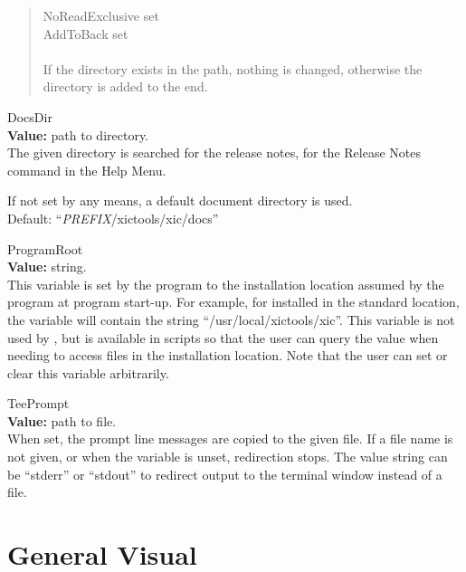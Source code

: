 \begin{quote}
{\et NoReadExclusive} set\\
{\et AddToBack} set\\
\\
If the directory exists in the path, nothing is changed, otherwise the
directory is added to the end.
\end{quote}

\begin{description}
\item{\et DocsDir}\\
{\bf Value:} path to directory.\\
The given directory is searched for the release notes, for the {\cb
Release Notes} command in the {\cb Help Menu}.

If not set by any means, a default document directory is used.\\
Default:  ``{\it PREFIX\/}{\vt /xictools/xic/docs}''

\item{\et ProgramRoot}\\
{\bf Value:} string.\\
This variable is set by the program to the installation location
assumed by the program at program start-up.  For example, for {\Xic}
installed in the standard location, the variable will contain the
string ``{\vt /usr/local/xictools/xic}''.  This variable is not used
by {\Xic}, but is available in scripts so that the user can query the
value when needing to access files in the installation location.  Note
that the user can set or clear this variable arbitrarily.

\item{\et TeePrompt}\\
{\bf Value:} path to file.\\
When set, the prompt line messages are copied to the given file.  If a
file name is not given, or when the variable is unset, redirection
stops.  The value string can be ``{\vt stderr}'' or ``{\vt stdout}''
to redirect output to the terminal window instead of a file.
\end{description}


\section{General Visual}

